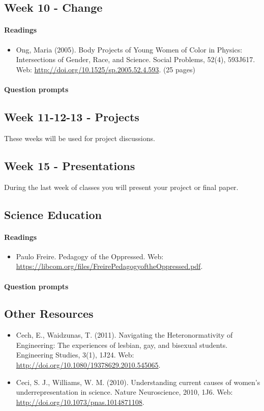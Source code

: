 \documentclass{article}
\begin{document}
\subsection{Week 10 - Change}
\paragraph{Readings}
\begin{itemize}
\item Ong, Maria (2005). Body Projects of Young Women of Color in Physics: Intersections of Gender, Race, and Science. Social Problems, 52(4), 593J617. Web: \url{http://doi.org/10.1525/sp.2005.52.4.593}. (25 pages)
\end{itemize}
\paragraph{Question prompts}


\subsection{Week 11-12-13 - Projects}
These weeks will be used for project discussions.


\subsection{Week 15 - Presentations}
During the last week of classes you will present your project or final paper.


\subsection{Science Education}
\paragraph{Readings}
\begin{itemize}
\item Paulo Freire. Pedagogy of the Oppressed. Web: \url{https://libcom.org/files/FreirePedagogyoftheOppressed.pdf}.
\end{itemize}
\paragraph{Question prompts}


\subsection*{Other Resources}
\begin{itemize}
\item Cech, E., Waidzunas, T. (2011). Navigating the Heteronormativity of Engineering: The  experiences of lesbian, gay, and bisexual students. Engineering Studies, 3(1), 1J24. Web: \url{http://doi.org/10.1080/19378629.2010.545065}.
\item Ceci, S. J., Williams, W. M. (2010). Understanding current causes of women's  underrepresentation in science. Nature Neuroscience, 2010, 1J6. Web: \url{http://doi.org/10.1073/pnas.1014871108}.
\end{itemize}
\end{document}
